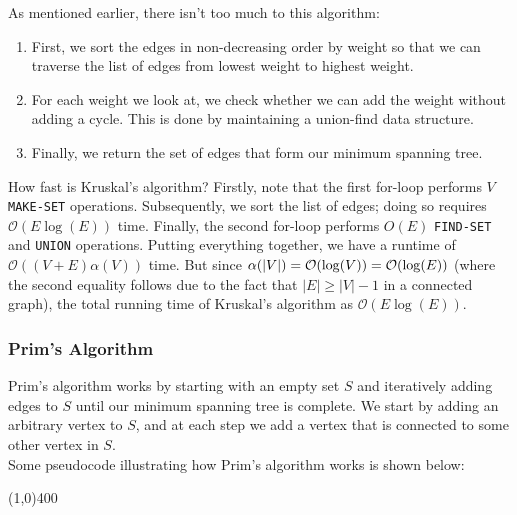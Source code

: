 As mentioned earlier, there isn't too much to this algorithm:

\begin{enumerate}
    \item First, we sort the edges in non-decreasing order by weight so that we can traverse the list of edges from lowest weight to highest weight.
    \item For each weight we look at, we check whether we can add the weight without adding a cycle. This is done by maintaining a union-find data structure.
    \item Finally, we return the set of edges that form our minimum spanning tree. 
\end{enumerate}


How fast is Kruskal's algorithm? Firstly, note that the first for-loop performs $V$ \verb!MAKE-SET! operations. Subsequently, we sort the list of edges; doing so requires $\mathcal{O}(E\log(E))$ time. Finally, the second for-loop performs $O(E)$ \verb!FIND-SET! and \verb!UNION! operations. Putting everything together, we have a runtime of $\mathcal{O}((V + E)\alpha(V))$ time. But since $\alpha(|V|) = \mathcal{O}(\log(V)) = \mathcal{O}(\log(E))$ (where the second equality follows due to the fact that $|E| \geq |V| - 1$ in a connected graph), the total running time of Kruskal's algorithm as $\mathcal{O}(E\log(E))$.


\subsubsection{Prim's Algorithm}

Prim's algorithm works by starting with an empty set $S$ and iteratively adding edges to $S$ until our minimum spanning tree is complete. We start by adding an arbitrary vertex to $S$, and at each step we add a vertex that is connected to some other vertex in $S$. \\


Some pseudocode illustrating how Prim's algorithm works is shown below:

\vspace{1em}
\begin{center}
\line(1,0){400}
\end{center}

